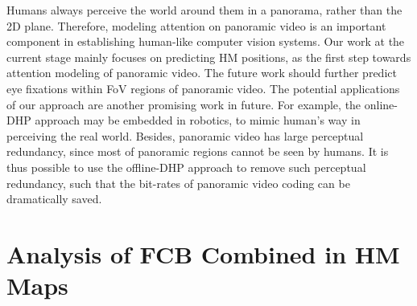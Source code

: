 \documentclass[10pt,journal,compsoc]{IEEEtran}
\begin{document}
Humans always perceive the world around them in a panorama, rather than the 2D plane. Therefore, modeling attention on panoramic video is an important component in establishing human-like computer vision systems. Our work at the current stage mainly focuses on predicting HM positions, as the first step towards attention modeling of panoramic video. The future work should further predict eye fixations within FoV regions of panoramic video. The potential applications of our approach are another promising work in future. For example, the online-DHP approach may be embedded in robotics, to mimic human's way in perceiving the real world. Besides, panoramic video has large perceptual redundancy, since most of panoramic regions cannot be seen by humans. It is thus possible to use the offline-DHP approach to remove such perceptual redundancy, such that the bit-rates of panoramic video coding can be dramatically saved.






%


\appendices
\section{Analysis of FCB Combined in HM Maps}
\end{document}
